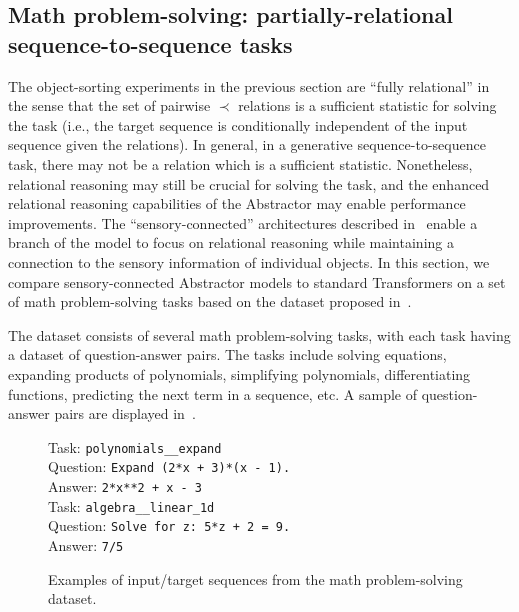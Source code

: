 \subsection{Math problem-solving: partially-relational sequence-to-sequence tasks}\label{ssec:experiments_math}

The object-sorting experiments in the previous section are ``fully relational'' in the sense that the set of pairwise $\prec$ relations is a sufficient statistic for solving the task (i.e., the target sequence is conditionally independent of the input sequence given the relations). In general, in a generative sequence-to-sequence task, there may not be a relation which is a sufficient statistic. Nonetheless, relational reasoning may still be crucial for solving the task, and the enhanced relational reasoning capabilities of the Abstractor may enable performance improvements. The ``sensory-connected'' architectures described in~ enable a branch of the model to focus on relational reasoning while maintaining a connection to the sensory information of individual objects. In this section, we compare sensory-connected Abstractor models to standard Transformers on a set of math problem-solving tasks based on the dataset proposed in~\citep{saxtonAnalyzingMathematicalReasoning2019}.

The dataset consists of several math problem-solving tasks, with each task having a dataset of question-answer pairs. The tasks include solving equations, expanding products of polynomials, simplifying polynomials, differentiating functions, predicting the next term in a sequence, etc. A sample of question-answer pairs are displayed in~.

\begin{figure}
    \begin{minipage}{0.5\textwidth}
        Task: \texttt{polynomials\_\_expand}\\
        Question: \texttt{Expand (2*x + 3)*(x - 1).}\\
        Answer: \texttt{2*x**2 + x - 3}\\

        Task: \texttt{algebra\_\_linear\_1d}\\
        Question: \texttt{Solve for z: 5*z + 2 = 9.}\\
        Answer: \texttt{7/5}\\
    \end{minipage}
    \caption{Examples of input/target sequences from the math problem-solving dataset.}\label{fig:math_dataset}
\end{figure}

